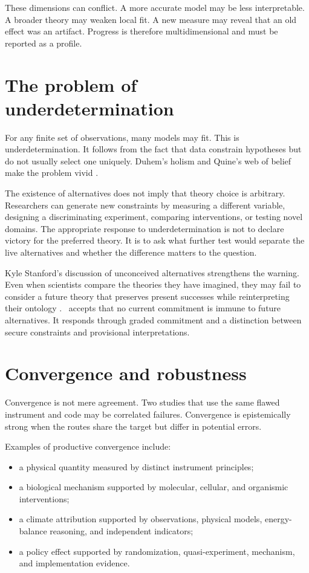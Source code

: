These dimensions can conflict. A more accurate model may be less interpretable.
A broader theory may weaken local fit. A new measure may reveal that an old
effect was an artifact. Progress is therefore multidimensional and must be
reported as a profile.

\section{The problem of underdetermination}

For any finite set of observations, many models may fit. This is
underdetermination. It follows from the fact that data constrain hypotheses
but do not usually select one uniquely. Duhem's holism and Quine's web of
belief make the problem vivid \citep{duhem1906,quine1951}.

The existence of alternatives does not imply that theory choice is arbitrary.
Researchers can generate new constraints by measuring a different variable,
designing a discriminating experiment, comparing interventions, or testing
novel domains. The appropriate response to underdetermination is not to
declare victory for the preferred theory. It is to ask what further test would
separate the live alternatives and whether the difference matters to the
question.

Kyle Stanford's discussion of unconceived alternatives strengthens the
warning. Even when scientists compare the theories they have imagined, they
may fail to consider a future theory that preserves present successes while
reinterpreting their ontology \citep{stanford2006}. \RCR\ accepts that no
current commitment is immune to future alternatives. It responds through
graded commitment and a distinction between secure constraints and provisional
interpretations.

\section{Convergence and robustness}

Convergence is not mere agreement. Two studies that use the same flawed
instrument and code may be correlated failures. Convergence is epistemically
strong when the routes share the target but differ in potential errors.

Examples of productive convergence include:

\begin{itemize}
\item a physical quantity measured by distinct instrument principles;
\item a biological mechanism supported by molecular, cellular, and organismic
interventions;
\item a climate attribution supported by observations, physical models,
energy-balance reasoning, and independent indicators;
\item a policy effect supported by randomization, quasi-experiment, mechanism,
and implementation evidence.
\end{itemize}

